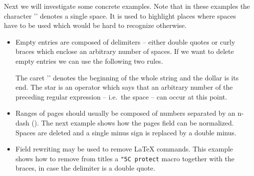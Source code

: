 \documentclass[11pt,a4paper]{scrbook}
\begin{document}
Next we will investigate some concrete examples. Note that in these examples
the character '\texttt{}' denotes a single space. It is used to
highlight places where spaces have to be used which would be hard to recognize
otherwise.

\begin{itemize}
\item Empty entries are composed of delimiters -- either double quotes or
  curly braces which enclose an arbitrary number of spaces. If we want to
  delete empty entries we can use the following two rules.

  \begin{Resources}
  \end{Resources}

  The caret '\texttt{}' denotes the beginning of the whole string
  and the dollar is its end. The star is an operator which says that an
  arbitrary number of the preceding regular expression -- i.e.\ the space --
  can occur at this point.

\item Ranges of pages should usually be composed of numbers separated by an
  n-dash (\opt{-}). The next example shows how the pages field can be
  normalized. Spaces are deleted and a single minus sign is replaced by a
  double minus.

  \begin{Resources}
  \end{Resources}

\item Field rewriting may be used to remove \LaTeX{} commands. This example
  shows how to remove from titles a \texttt{\char"5C protect} macro together with
  the braces, in case the delimiter is a double quote.

  \begin{Resources}
  \end{Resources}
\end{itemize}
\end{document}
